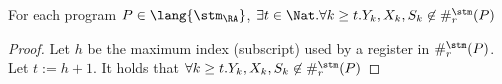 \begin{cor}
  \label{cor:freshreg}
  For each program $P \in \lang{\stm_\RA}$,
  $\exists t \in \Nat. \forall k\ge t. Y_{k}, X_k, S_k\not \in\#_r^\stm(P)$
\end{cor}
\begin{proof}
 Let $h$ be the maximum index (subscript)
 used by a register in $\#_r^\stm(P)$. Let $t:=h+1$.
 It holds that $\forall k\ge t.Y_k, X_k, S_k\not \in\#_r^\stm(P)$
\end{proof}


\begin{comment}
Now we should show that the oracles used by $\POR$ functions can be limited to a finite and polinomially sized domain. This result will be inherited by $\SIFP$ programs, too. This result will allow us to formalize the fact that when tanslating $\SIFP$ on multitape $\SFP$ machines we will end up with a machine which is not pointwise identical to the starting $P \in \SIFP$, but which will preserve the measure of any output given the input.


\end{comment}
